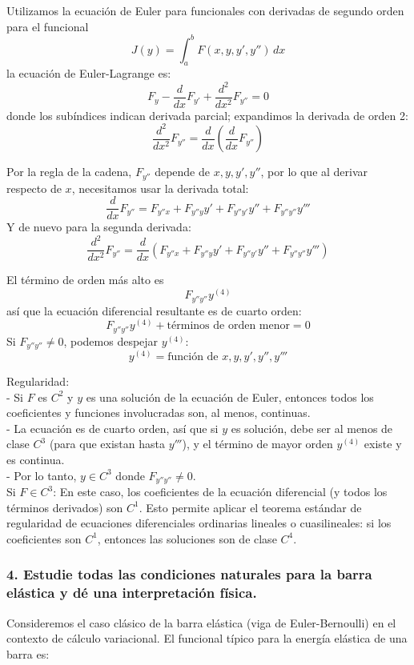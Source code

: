 \documentclass{article}
\theoremstyle{nonumberplain}
\begin{document}
Utilizamos la ecuación de Euler para funcionales con derivadas de segundo orden para el funcional
\[
J(y) = \int_a^b F\left(x, y, y', y''\right)\,dx
\]
la ecuación de Euler-Lagrange es:
\[
F_y - \frac{d}{dx} F_{y'} + \frac{d^2}{dx^2} F_{y''} = 0
\]
donde los subíndices indican derivada parcial; expandimos la derivada de orden 2:
\[
\frac{d^2}{dx^2} F_{y''} = \frac{d}{dx}\left(\frac{d}{dx} F_{y''}\right)
\]

Por la regla de la cadena, \(F_{y''}\) depende de \(x, y, y', y''\), por lo que al derivar respecto de \(x\), necesitamos usar la derivada total:
\[
\frac{d}{dx} F_{y''} = F_{y''x} + F_{y''y} y' + F_{y''y'} y'' + F_{y''y''} y'''
\]
Y de nuevo para la segunda derivada:
\[
\frac{d^2}{dx^2} F_{y''} = \frac{d}{dx}\left(F_{y''x} + F_{y''y} y' + F_{y''y'} y'' + F_{y''y''} y'''\right)
\]

El término de orden más alto es
\[
F_{y''y''} y^{(4)}
\]
así que la ecuación diferencial resultante es de cuarto orden:
\[
F_{y''y''} y^{(4)} + \text{términos de orden menor} = 0
\]
Si \(F_{y''y''} \neq 0\), podemos despejar \(y^{(4)}\):
\[
y^{(4)} = \text{función de } x, y, y', y'', y'''
\]

Regularidad: \\
- Si \(F\) es \(C^2\) y \(y\) es una solución de la ecuación de Euler, entonces todos los coeficientes y funciones involucradas son, al menos, continuas. \\
- La ecuación es de cuarto orden, así que si \(y\) es solución, debe ser al menos de clase \(C^3\) (para que existan hasta \(y'''\)), y el término de mayor orden \(y^{(4)}\) existe y es continua. \\
- Por lo tanto, \(y \in C^3\) donde \(F_{y''y''} \neq 0\). \\
Si \(F \in C^3\): En este caso, los coeficientes de la ecuación diferencial (y todos los términos derivados) son \(C^1\). Esto permite aplicar el teorema estándar de regularidad de ecuaciones diferenciales ordinarias lineales o cuasilineales: si los coeficientes son \(C^1\), entonces las soluciones son de clase \(C^4\).

\subsubsection*{4. Estudie todas las condiciones naturales para la barra elástica y dé una interpretación física.}

Consideremos el caso clásico de la barra elástica (viga de Euler-Bernoulli) en el contexto de cálculo variacional. El funcional típico para la energía elástica de una barra es:
\end{document}

